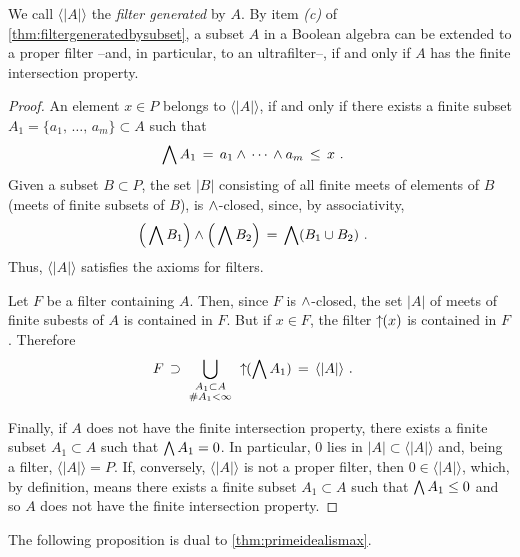 We call $\langle |A|\rangle$ the \emph{filter generated} by $A$. By
item \textit{(c)} of \ref{thm:filtergeneratedbysubset}, a subset $A$ in a
Boolean algebra can be extended to a proper filter --and, in particular, to
an ultrafilter--, if and only if $A$ has the finite intersection property.

\begin{proof}
	An element $x\in P$ belongs to $\langle |A|\rangle$, if and only
	if there exists a finite subset
	$A_{1}=\{a_{1},\,\dots,\,a_{m}\}\subset A$ such that
	\begin{align*}
		\bigwedge A_{1} & \,=\,
			a_{1}\wedge\,\cdots\,\wedge a_{m} \,\leq\, x
		\text{ .}
	\end{align*}
	Given a subset $B\subset P$, the set $|B|$ consisting of all
	finite meets of elements of $B$ (meets of finite subsets of $B$),
	is $\wedge$-closed, since, by associativity,
	\begin{align*}
		\Big(\bigwedge B_{1}\Big)\wedge
			\Big(\bigwedge B_{2}\Big) &
			\,=\,\bigwedge (B_{1}\cup B_{2})
		\text{ .}
	\end{align*}
	Thus, $\langle |A|\rangle$ satisfies the axioms for filters.

	Let $F$ be a filter containing $A$. Then, since $F$ is
	$\wedge$-closed, the set $|A|$ of meets of finite subests of $A$
	is contained in $F$. But if $x\in F$, the filter $\uparrow\!\!(x)$ is
	contained in $F$. Therefore
	\begin{align*}
		F & \,\supset\,\bigcup_{
			\begin{smallmatrix}
				A_{1}\subset A\\
				\# A_{1}<\infty
			\end{smallmatrix}}\,\uparrow\!\!(\bigwedge A_{1})
			\,=\,\langle |A|\rangle
		\text{ .}
	\end{align*}

	Finally, if $A$ does not have the finite intersection property,
	there exists a finite subset $A_{1}\subset A$ such that
	$\bigwedge A_{1}=0$. In particular, $0$ lies in
	$|A|\subset\langle |A|\rangle$ and, being a filter,
	$\langle |A|\rangle=P$. If, conversely, $\langle |A|\rangle$ is not a
	proper filter, then $0\in\langle |A|\rangle$, which, by definition,
	means there exists a finite subset $A_{1}\subset A$ such that
	$\bigwedge A_{1}\leq 0$ and so $A$ does not have the finite
	intersection property.
\end{proof}

The following proposition is dual to \ref{thm:primeidealismax}.

